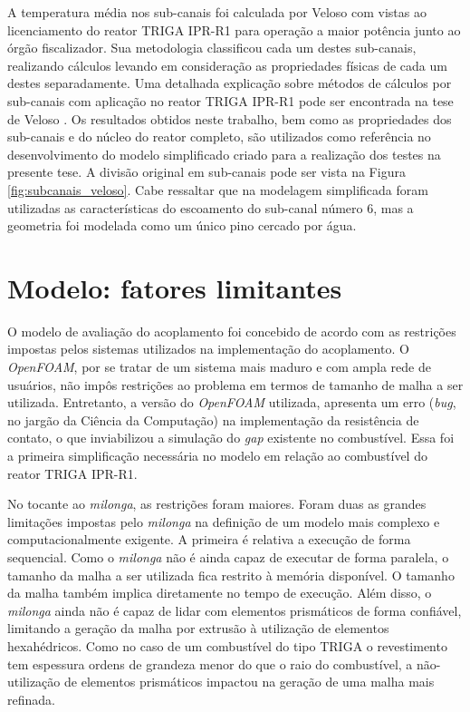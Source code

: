 A temperatura média nos sub-canais foi calculada por Veloso \cite[Capítulo~8]{Veloso2005} com vistas ao licenciamento
do reator TRIGA IPR-R1 para operação a maior potência junto ao órgão fiscalizador. Sua metodologia
classificou cada um destes sub-canais, realizando cálculos levando
em consideração as propriedades físicas de cada um destes separadamente. Uma detalhada
explicação sobre métodos de cálculos por sub-canais com aplicação no reator TRIGA IPR-R1
pode ser encontrada na tese de Veloso \cite{Veloso2004}. Os resultados obtidos neste
trabalho, bem como as propriedades dos sub-canais e do núcleo do reator completo, são utilizados
como referência no desenvolvimento do modelo simplificado criado para a realização dos testes na
presente tese. A divisão original em sub-canais pode ser vista na Figura \ref{fig:subcanais_veloso}. Cabe
ressaltar que na modelagem simplificada foram utilizadas as características do escoamento do
sub-canal número $6$, mas a geometria foi modelada como um único pino cercado por água.


\section{Modelo: fatores limitantes}
\label{sec:lim}

O modelo de avaliação do acoplamento foi concebido de acordo com as restrições impostas pelos sistemas
utilizados na implementação do acoplamento. O \textit{OpenFOAM}, por se tratar de um sistema mais maduro
e com ampla rede de usuários, não impôs
restrições ao problema em termos de tamanho de malha a ser utilizada. Entretanto, a versão
do \textit{OpenFOAM} utilizada,
apresenta um erro (\textit{bug}, no jargão da Ciência da Computação) na implementação da resistência
de contato, o que inviabilizou a simulação do \textit{gap} existente no combustível. Essa foi a
primeira simplificação necessária no modelo em relação ao combustível do reator TRIGA IPR-R1.

No tocante ao \textit{milonga}, as restrições foram maiores. Foram duas as grandes limitações impostas
pelo \textit{milonga} na definição de um modelo mais complexo e computacionalmente exigente. A primeira
é relativa a execução de forma sequencial. Como o \textit{milonga} não é ainda capaz de executar de
forma paralela, o tamanho da malha a ser utilizada fica restrito à memória disponível.
O tamanho da malha também implica diretamente no tempo de execução.
Além disso, o \textit{milonga} ainda não é capaz de lidar com elementos prismáticos de forma confiável, limitando a
geração da malha por extrusão à utilização de elementos hexahédricos.
Como no caso de um combustível do tipo TRIGA o revestimento tem espessura ordens de grandeza
menor do que o raio do combustível, a não-utilização de elementos prismáticos impactou na geração
de uma malha mais refinada.

